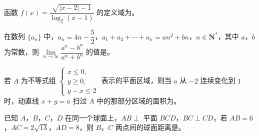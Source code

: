 \begin{question}
函数 $f(x)=\dfrac{\sqrt{|x-2|-1}}{\log_2(x-1)}$ 的定义域为\gkblank{}。

\end{question}
\begingroup
\renewenvironment{question}{\Needspace{0.46\textheight}}{}
\begin{question}
在数列 $\{a_n\}$ 中，$a_n=4n-\dfrac52$，$a_1+a_2+\cdots+a_n=an^2+bn$，$n\in\mathbf N^*$，其中 $a$，$b$ 为常数，则 $\lim\limits_{n\to\infty}\dfrac{a^n-b^n}{a^n+b^n}$ 的值是\gkblank{}。

\end{question}
\endgroup
\begin{question}
若 $A$ 为不等式组 $\begin{cases}x\leqslant0,\\ y\geqslant0,\\ y-x\leqslant2\end{cases}$ 表示的平面区域，则当 $a$ 从 $-2$ 连续变化到 $1$ 时，动直线 $x+y=a$ 扫过 $A$ 中的那部分区域的面积为\gkblank{}。

\end{question}
\begin{question}
已知 $A$，$B$，$C$，$D$ 在同一个球面上，$AB\perp$ 平面 $BCD$，$BC\perp CD$，若 $AB=6$，$AC=2\sqrt{13}$，$AD=8$，则 $B$，$C$ 两点间的球面距离是\gkblank{}。

\end{question}

